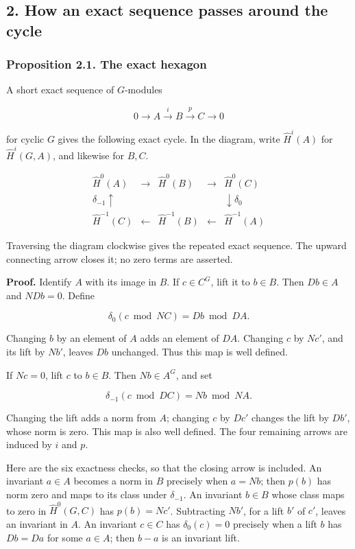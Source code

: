 \documentclass[11pt,a4paper]{article}
\begin{document}
\subsection{2. How an exact sequence passes around the
cycle}\label{how-an-exact-sequence-passes-around-the-cycle}

\subsubsection{Proposition 2.1. The exact
hexagon}\label{proposition-2.1.-the-exact-hexagon}

A short exact sequence of \(G\)-modules

\[
0\longrightarrow A\xrightarrow{i}B\xrightarrow{p}C\longrightarrow0
\]

for cyclic \(G\) gives the following exact cycle. In the diagram, write
\(\widehat H^i(A)\) for \(\widehat H^i(G,A)\), and likewise for \(B,C\).

\[
\begin{array}{ccccc}
\widehat H^0(A)&\longrightarrow&\widehat H^0(B)&\longrightarrow&\widehat H^0(C)\\
{\scriptstyle\delta_{-1}}\uparrow&&&&\downarrow{\scriptstyle\delta_0}\\
\widehat H^{-1}(C)&\longleftarrow&\widehat H^{-1}(B)&\longleftarrow&\widehat H^{-1}(A)
\end{array}
\]

Traversing the diagram clockwise gives the repeated exact sequence. The
upward connecting arrow closes it; no zero terms are asserted.

\textbf{Proof.} Identify \(A\) with its image in \(B\). If \(c\in C^G\),
lift it to \(b\in B\). Then \(Db\in A\) and \(NDb=0\). Define

\[
\delta_0(c\bmod NC)=Db\bmod DA.
\]

Changing \(b\) by an element of \(A\) adds an element of \(DA\).
Changing \(c\) by \(Nc'\), and its lift by \(Nb'\), leaves \(Db\)
unchanged. Thus this map is well defined.

If \(Nc=0\), lift \(c\) to \(b\in B\). Then \(Nb\in A^G\), and set

\[
\delta_{-1}(c\bmod DC)=Nb\bmod NA.
\]

Changing the lift adds a norm from \(A\); changing \(c\) by \(Dc'\)
changes the lift by \(Db'\), whose norm is zero. This map is also well
defined. The four remaining arrows are induced by \(i\) and \(p\).

Here are the six exactness checks, so that the closing arrow is
included. An invariant \(a\in A\) becomes a norm in \(B\) precisely when
\(a=Nb\); then \(p(b)\) has norm zero and maps to its class under
\(\delta_{-1}\). An invariant \(b\in B\) whose class maps to zero in
\(\widehat H^0(G,C)\) has \(p(b)=Nc'\). Subtracting \(Nb'\), for a lift
\(b'\) of \(c'\), leaves an invariant in \(A\). An invariant \(c\in C\)
has \(\delta_0(c)=0\) precisely when a lift \(b\) has \(Db=Da\) for some
\(a\in A\); then \(b-a\) is an invariant lift.
\end{document}
